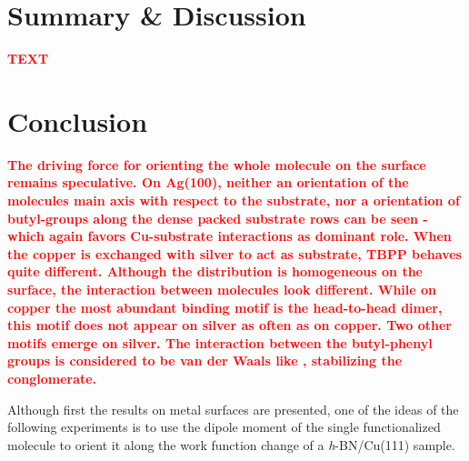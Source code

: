 \section{Summary \& Discussion}
\textcolor{red}{\textbf{TEXT}}
	
\section{Conclusion}
\textcolor{red}{\textbf{
		The driving force for orienting the whole molecule on the surface remains speculative. On Ag(100), neither an orientation of the molecules main axis with respect to the substrate, nor a orientation of butyl-groups along the dense packed substrate rows can be seen - which again favors Cu-substrate interactions as dominant role.
		When the copper is exchanged with silver to act as substrate, TBPP behaves quite different. Although the distribution is homogeneous on the surface, the interaction between molecules look different. While on copper the most abundant binding motif is the head-to-head dimer, this motif does not appear on silver as often as on copper. Two other motifs emerge on silver.
		The interaction between the butyl-phenyl groups is considered to be van der Waals like \cite{iacovita_controlling_2012}, stabilizing the conglomerate.
	}}
	
Although first the results on metal surfaces are presented, one of the ideas of the following experiments is to use the dipole moment of the single functionalized molecule to orient it along the work function change of a \textit{h}-BN/Cu(111) sample. 
